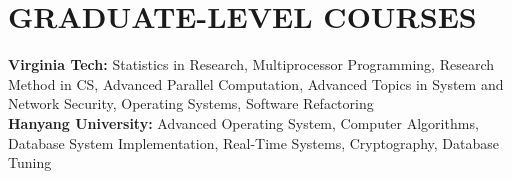 \section{GRADUATE-LEVEL COURSES}
\vspace{0.03in}
{\bf Virginia Tech:} Statistics in Research, Multiprocessor Programming,
Research Method in CS, Advanced Parallel Computation, Advanced Topics in System
and Network Security, Operating Systems, Software Refactoring\vspace{0.02in}\\
{\bf Hanyang University:} Advanced Operating System, Computer Algorithms,
Database System Implementation, Real-Time Systems,
Cryptography, Database Tuning
